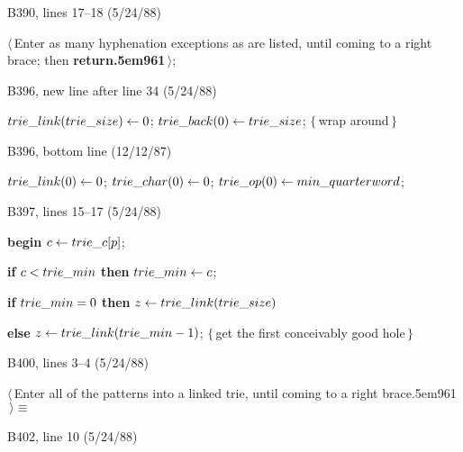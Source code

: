 \bugonpage B390, lines 17--18 (5/24/88)

\ninepoint\noindent\kern10pt
$\langle\,$Enter as many hyphenation exceptions as are listed, until coming
 to a right brace; then {\bf return\eightrm\kern.5em961}$\,\rangle$;


\bugonpage B396, new line after line 34 (5/24/88)

\ninepoint\noindent\kern10pt
$\\{trie\_link}(\\{trie\_size})\gets0$;
$\\{trie\_back}(0)\gets\\{trie\_size}$;\quad
$\{\,$wrap around$\,\}$

\bugonpage B396, bottom line (12/12/87)

\ninepoint\noindent\hskip10pt
$\\{trie\_link}(0)\gets0$; $\\{trie\_char}(0)\gets0$;
 $\\{trie\_op}(0)\gets\\{min\_quarterword}$;

\bugonpage B397, lines 15--17 (5/24/88)

\ninepoint\noindent\kern10pt
{\bf begin} $c\gets\\{trie\_c}[p]$;\par\noindent\kern10pt
{\bf if} $c<\\{trie\_min}$ {\bf then} $\\{trie\_min}\gets c$;\par\noindent\kern10pt
{\bf if} $\\{trie\_min}=0$ {\bf then} $z\gets\\{trie\_link}(\\{trie\_size})$\par
\noindent\kern10pt
{\bf else} $z\gets\\{trie\_link}(\\{trie\_min}-1)$;\quad
$\{\,$get the first conceivably good hole$\,\}$

\bugonpage B400, lines 3--4 (5/24/88)

\ninepoint\noindent
$\langle\,$Enter all of the patterns into a linked trie, until coming
 to a right brace{\eightrm\kern.5em961}$\,\rangle\equiv$


\bugonpage B402, line 10 (5/24/88)


